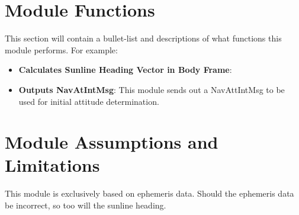 

\section{Module Functions}
This section will contain a bullet-list and descriptions of what functions this module performs. For example:
\begin{itemize}
	\item \textbf{Calculates Sunline Heading Vector in Body Frame}:
	\item \textbf{Outputs NavAtIntMsg}: This module sends out a NavAttIntMsg to be used for initial attitude determination.
\end{itemize}

\section{Module Assumptions and Limitations}
This module is exclusively based on ephemeris data. Should the ephemeris data be incorrect, so too will the sunline heading.